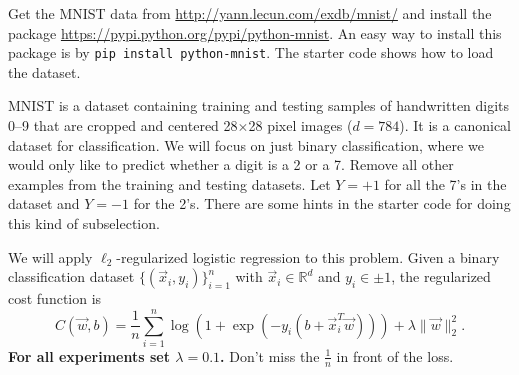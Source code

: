 \documentclass{article}
\newcommand{\R}{\mathbb{R}} %
\begin{document}
Get the MNIST data from
\url{http://yann.lecun.com/exdb/mnist/}
and install the package
\url{https://pypi.python.org/pypi/python-mnist}.
An easy way to install this package is by {\tt pip install python-mnist}.
The starter code shows how to load the dataset.

MNIST is a dataset containing training and testing samples of handwritten digits
0--9
that are cropped and centered 28$\times$28 pixel images ($d=784$).
It is a canonical dataset for classification.
We will focus on just binary classification, where we would only like
to predict whether a digit is a 2 or a 7.
Remove all other examples from the training and testing datasets.
Let $Y=+1$ for all the 7's in the dataset and $Y=-1$ for the 2's.
There are some hints in the starter code for doing this kind of subselection.

We will apply $\ell_2$-regularized logistic regression to this problem.
Given a binary classification dataset 
$\{(\vec x_i, y_i)\}_{i=1}^n$
with $\vec x_i \in \R^d$ and $y_i \in \pm 1$,
the regularized cost function is
\begin{equation}
  \label{eq:logistic}
  C(\vec w, b) = \frac{1}{n} \sum_{i=1}^n \log( 1 + \exp(-y_i (b + \vec x_i^T \vec w)))
  + \lambda \| \vec w \|_2^2.
\end{equation}
{\bf For all experiments set $\lambda = 0.1$.}
Don't miss the $\frac{1}{n}$ in front of the loss.
\end{document}
